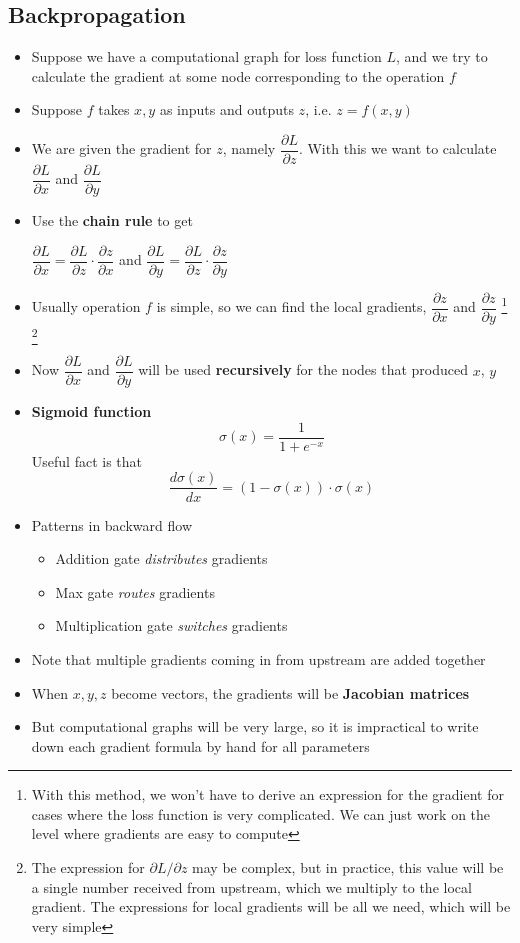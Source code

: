 \subsection{Backpropagation}
\begin{itemize}
	\item Suppose we have a computational graph for loss function $L$, and we try to calculate the gradient at some node corresponding to the operation $f$
	\item Suppose $f$ takes $x, y$ as inputs and outputs $z$, i.e. $z = f(x, y)$
	\item We are given the gradient for $z$, namely $\dfrac{\partial L}{\partial z}$. With this we want to calculate $\dfrac{\partial L}{\partial x}$ and $\dfrac{\partial L}{\partial y}$
	\item Use the \textbf{chain rule} to get
	\begin{center}
		$\dfrac{\partial L}{\partial x} = \dfrac{\partial L}{\partial z}\cdot \dfrac{\partial z}{\partial x}$ \quad and \quad $\dfrac{\partial L}{\partial y} = \dfrac{\partial L}{\partial z}\cdot \dfrac{\partial z}{\partial y}$
	\end{center}
	\item Usually operation $f$ is simple, so we can find the local gradients, $\dfrac{\partial z}{\partial x}$ and $ \dfrac{\partial z}{\partial y}$ \footnote{With this method, we won't have to derive an expression for the gradient for cases where the loss function is very complicated. We can just work on the level where gradients are easy to compute} \footnote{The expression for $\partial L/\partial z$ may be complex, but in practice, this value will be a single number received from upstream, which we multiply to the local gradient. The expressions for local gradients will be all we need, which will be very simple}
	\item Now $\dfrac{\partial L}{\partial x}$ and $\dfrac{\partial L}{\partial y}$ will be used \textbf{recursively} for the nodes that produced $x$, $y$
	\item \textbf{Sigmoid function}
	\[ \sigma (x) = \frac{1}{1+e^{-x}} \]
	Useful fact is that
	\[ \frac{d \sigma(x)}{dx} = (1-\sigma(x))\cdot \sigma(x) \]
	\item Patterns in backward flow
	\begin{itemize}
		\item Addition gate \textit{distributes} gradients
		\item Max gate \textit{routes} gradients
		\item Multiplication gate \textit{switches} gradients
	\end{itemize} 
	\item Note that multiple gradients coming in from upstream are added together
	\item When $x, y, z$ become vectors, the gradients will be \textbf{Jacobian matrices}
	\item But computational graphs will be very large, so it is impractical to write down each gradient formula by hand for all parameters 
\end{itemize}

